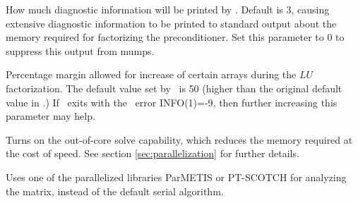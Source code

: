 \myhrule

{How much diagnostic information will be printed by \mumps. Default is 3, causing extensive diagnostic information to be printed 
to standard output about the memory required for factorizing the preconditioner.
Set this parameter to 0 to suppress this output from mumps.}

\myhrule

{Percentage margin allowed for increase of certain arrays during the $LU$ factorization.
The default value set by \sfincs~is 50 (higher than the original default value in \mumps.)
If \sfincs~exits with the \mumps~error {\ttfamily INFO(1)=-9}, then further increasing this parameter may help.}

\myhrule

{Turns on the out-of-core solve capability,
which reduces the memory required at the cost of speed.
See section \ref{sec:parallelization} for further details.}

\myhrule

{Uses one of the parallelized libraries ParMETIS or PT-SCOTCH for analyzing the matrix,
instead of the default serial algorithm.}


